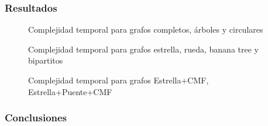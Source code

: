 \subsubsection{Resultados}

\begin{figure}[H]
    \centering
    \fontsize{8}{10}\selectfont
    \resizebox{0.8\textwidth}{!}{}
    \caption{Complejidad temporal para grafos completos, \'arboles y circulares}
\end{figure}

\begin{figure}[H]
    \centering
    \fontsize{8}{10}\selectfont
    \resizebox{0.8\textwidth}{!}{}
    \caption{Complejidad temporal para grafos estrella, rueda, banana tree y bipartitos}
\end{figure}

\begin{figure}[H]
    \centering
    \fontsize{8}{10}\selectfont
    \resizebox{0.8\textwidth}{!}{}
    \caption{Complejidad temporal para grafos Estrella+CMF, Estrella+Puente+CMF}
\end{figure}

\subsubsection{Conclusiones}
